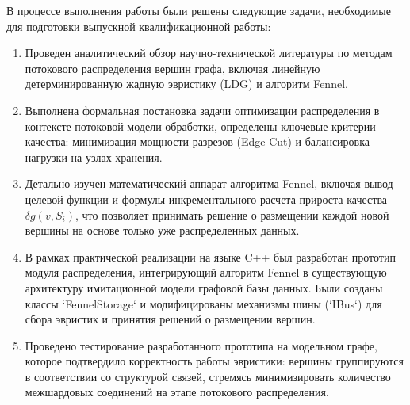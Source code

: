 \documentclass[a4paper, 12pt]{article}
\begin{document}
В процессе выполнения работы были решены следующие задачи, необходимые для подготовки выпускной квалификационной работы:
\begin{enumerate}
    \item Проведен аналитический обзор научно-технической литературы по методам потокового распределения вершин графа, включая линейную детерминированную жадную эвристику (LDG) и алгоритм Fennel.
    \item Выполнена формальная постановка задачи оптимизации распределения в контексте потоковой модели обработки, определены ключевые критерии качества: минимизация мощности разрезов (Edge Cut) и балансировка нагрузки на узлах хранения.
    \item Детально изучен математический аппарат алгоритма Fennel, включая вывод целевой функции и формулы инкрементального расчета прироста качества \( \delta g(v, S_i) \), что позволяет принимать решение о размещении каждой новой вершины на основе только уже распределенных данных.
    \item В рамках практической реализации на языке C++ был разработан прототип модуля распределения, интегрирующий алгоритм Fennel в существующую архитектуру имитационной модели графовой базы данных. Были созданы классы `FennelStorage` и модифицированы механизмы шины (`IBus`) для сбора эвристик и принятия решений о размещении вершин.
    \item Проведено тестирование разработанного прототипа на модельном графе, которое подтвердило корректность работы эвристики: вершины группируются в соответствии со структурой связей, стремясь минимизировать количество межшардовых соединений на этапе потокового распределения.
\end{enumerate}

\newpage

\newpage
%
\end{document}
